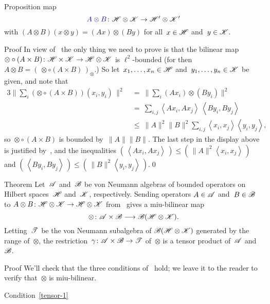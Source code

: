\documentclass[a]{subfiles}
\begin{document}
\begin{parsec}
\begin{point}{Proposition}
map 
\begin{equation*}
	\Define{A\otimes B}\colon \scrH\otimes\scrK\to\scrH'\otimes\scrK'
\end{equation*}
with $(A\otimes B)(x\otimes y)=(Ax)\otimes (By)$
for all~$x\in\mathscr{H}$
and~$y\in\mathscr{K}$.
\begin{point}{Proof}%
In view of~
the only thing we need
to prove is that the bilinear map
$\otimes\circ (A\times B)\colon \mathscr{H}\times \mathscr{K}
\to\mathscr{H}\otimes\mathscr{K}$
is $\ell^2$-bounded
(for then~$A\otimes B=(\,\otimes\circ (A\times B)\,)_\otimes$.)
So let~$x_1,\dotsc,x_n\in\mathscr{H}$
and~$y_1,\dotsc,y_n\in\mathscr{K}$
be given,
and note that
\begin{alignat*}{3}
	\|\sum_{i}(\otimes\circ(A\times B))(x_i,y_i)\,\|^2
	\ &=\ 
	\|\sum_{i} (Ax_i)\otimes (By_i)\|^2
	\\
	\ &=\ 
	\sum_{i,j} 
	\left<Ax_i,Ax_j\right>
	\,\left<By_i,By_j\right>
	\\
	\ &\leq\ 
	\|A\|^2\|B\|^2
	\sum_{i,j} 
	\left<x_i,x_j\right>
	\left<y_i,y_j\right>,
\end{alignat*}
so~$\otimes\circ(A\times B)$
is bounded by~$\|A\|\|B\|$.
The last step in the display above
is justified by~,
and the inequalities
$(\,\left<Ax_i,A x_j\right>\,)\leq
(\, \|A\|^2 \left<x_i,x_j\right>\,)$
and
$(\,\left<By_i,B y_j\right>\,)\leq
(\, \|B\|^2 \left<y_i,y_j\right>\,)$.\qed
\end{point}
\end{point}
\begin{point}[special-tensor]{Theorem}%
Let~$\mathscr{A}$
and~$\mathscr{B}$
be von Neumann algebras
of bounded operators
on Hilbert spaces~$\mathscr{H}$ and~$\mathscr{K}$,
respectively.
Sending operators $A\in\mathscr{A}$ and~$B\in\mathscr{B}$
to $A\otimes B\colon \mathscr{H}\otimes \mathscr{K}\to\mathscr{H}\otimes \mathscr{K}$
from~ gives
a miu-bilinear 
map 
\begin{equation*}
	\otimes\colon \mathscr{A}\times \mathscr{B}\longrightarrow
	\mathscr{B}(\mathscr{H}\otimes\mathscr{K}).
\end{equation*}
Letting~$\mathscr{T}$ 
be the von Neumann subalgebra
of $\mathscr{B}(\mathscr{H}\otimes\mathscr{K})$
generated by the range of~$\otimes$,
the restriction~$\gamma\colon \mathscr{A}\times \mathscr{B}\to\mathscr{T}$
of~$\otimes$
is a tensor product of~$\mathscr{A}$ and~$\mathscr{B}$.
\begin{point}{Proof}%
We'll check that the three conditions of~ hold;
we leave it to the reader to verify that~$\otimes$
is miu-bilinear.
\begin{point}{Condition~\ref{tensor-1}}%

\end{point}
\end{point}
\end{point}
\end{parsec}
\end{document}
